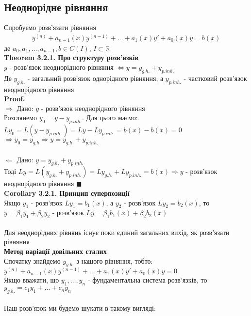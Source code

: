 \documentclass[a4paper, 14pt]{extarticle}
\def\th#1{\textbf{Theorem {#1}}}
\def\crl#1{\textbf{Corollary {#1}}}
\def\proof{\textbf{Proof.}\\}
\def\bigline{\vspace{5mm}\\}
\def\qed{$\blacksquare$}
\begin{document}
\subsection{Неоднорідне рівняння}
Спробуємо розв'язати рівняння
\begin{align*}
y^{(n)} + a_{n-1}(x)y^{(n-1)}+\dots+a_1(x)y'+a_0(x)y = b(x)
\end{align*}
де $a_0, a_1,\dots,a_{n-1}, b\in C(I)$, $I \subset \mathbb{R}$\\
\th{3.2.1. Про структуру розв'язків}\\
$y$ - розв'язок неоднорідного рівняння $\iff y = y_{g.h.} + y_{p.inh.}$\\
Де $y_{g.h.}$ - загальний розв'язок однорідного рівняння, а $y_{p.inh.}$ - частковий розв'язок неоднорідного рівняння\\
\proof
$\boxed{\Rightarrow}$ Дано: $y$ - розв'язок неоднорідного рівняння\\
Розглянемо $y_0 = y - y_{p.inh.}$. Для цього маємо:\\
$Ly_0 = L(y - y_{p.inh,}) = Ly - Ly_{p.inh.} = b(x) - b(x) = 0$\\
$\Rightarrow y_0 = y_{g.h} \Rightarrow y = y_{g.h.} + y_{p.inh.}$\\
\\
$\boxed{\Leftarrow}$ Дано: $y = y_{g.h.} + y_{p.inh.}$\\
Тоді $Ly = L(y_{g.h.} + y_{p.inh.}) = Ly_{g.h.} + Ly_{p.inh.} = b(x) \Rightarrow y$ - розв'язок неоднорідного рівняння \qed \\
\crl{3.2.1. Принцип суперпозиції}\\
Якщо $y_1$ - розв'язок $Ly_1 = b_1(x)$, а $y_2$ - розв'язок $Ly_2 = b_2(x)$, то\\
$y = \beta_1 y_1 + \beta_2 y_2$ - розв'язок $Ly = \beta_1 b_1(x) + \beta_2 b_2(x)$\\
\bigline
Для неоднорідних рівнянь існує поки єдиний загальних вихід, як розв'язати рівняння\\
\textbf{Метод варіації довільних сталих}\\
Спочатку знайдемо $y_{g.h.}$ з нашого рівняння, тобто:\\
$y^{(n)} + a_{n-1}(x)y^{(n-1)}+\dots+a_1(x)y'+a_0(x)y = 0$\\
Якщо вважати, що $y_1, \dots, y_n$ - фундаментальна система розв'язків, то\\
$y_{g.h.} = c_1y_1 + \dots + c_n y_n$\\
\\
Наш розв'язок ми будемо шукати в такому вигляді:\\
\end{document}
